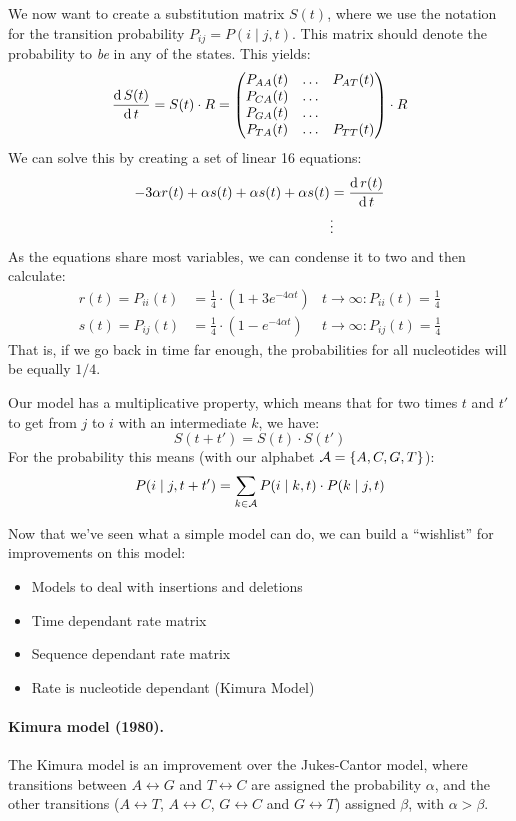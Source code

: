We now want to create a substitution matrix \(S(t)\), where we use the
notation for the transition probability \(P_{ij}=P(i\mid j,t)\).
This matrix should denote the probability to \emph{be} in any of the states.
This yields:
\[
  \frac{\operatorname{d} S(t)}{\operatorname{d} t} = S(t) \cdot R = 
  \begin{pmatrix}
      P_{AA}(t) & \hdots & P_{AT}(t) \\
      P_{CA}(t) & \hdots &           \\
      P_{GA}(t) & \hdots &           \\
      P_{TA}(t) & \hdots & P_{TT}(t) \\
  \end{pmatrix} \cdot R
\]
We can solve this by creating a set of linear 16 equations:
\begin{align*}
  -3\alpha r(t) + \alpha s(t) + \alpha s(t) + \alpha s(t) &= \frac{\operatorname{d} r(t)}{\operatorname{d} t} \\
  &\vdots
\end{align*}
As the equations share most variables, we can condense it to two and then
calculate:
\begin{align*}
  r(t) = P_{ii}(t) &= \frac{1}{4}\cdot (1+3e^{-4\alpha t}) & t\to\infty: P_{ii}(t) = \frac{1}{4} \\
  s(t) = P_{ij}(t) &= \frac{1}{4}\cdot (1- e^{-4\alpha t}) & t\to\infty: P_{ij}(t) = \frac{1}{4}
\end{align*}
That is, if we go back in time far enough, the probabilities for all
nucleotides will be equally \(1/4\).

Our model has a multiplicative property, which means that for two times
\(t\) and \(t'\) to get from \(j\) to \(i\) with an intermediate \(k\), we
have:
\[
  S(t+t') = S(t)\cdot S(t')
\]
For the probability this means (with our alphabet \(\mathcal{A}=\{A,C,G,T\}\)):
\[
  P(i\mid j, t+t') = \sum_{k\in\mathcal{A}} P(i\mid k,t) \cdot P(k\mid j, t)
\]

Now that we've seen what a simple model can do, we can build a
\enquote{wishlist} for improvements on this model:
\begin{itemize}
\item Models to deal with insertions and deletions
\item Time dependant rate matrix
\item Sequence dependant rate matrix
\item Rate is nucleotide dependant (Kimura Model)
\end{itemize}

\paragraph{Kimura model (1980).}  The Kimura model is an improvement over
the Jukes-Cantor model, where transitions between \(A\leftrightarrow G\) and
\(T\leftrightarrow C\) are assigned the probability \(\alpha\), and the
other transitions (\(A\leftrightarrow T\), \(A\leftrightarrow C\),
\(G\leftrightarrow C\) and \(G\leftrightarrow T\)) assigned \(\beta\), with
\(\alpha > \beta\).

